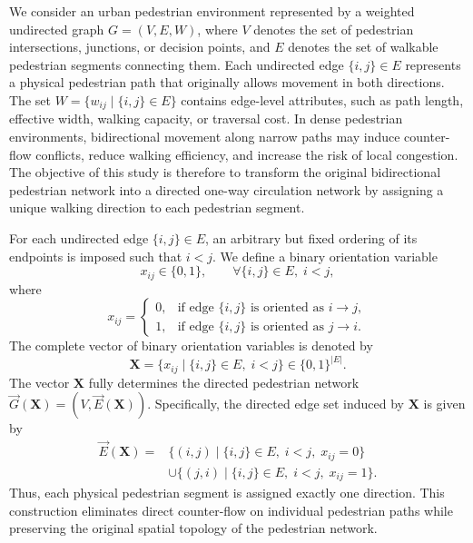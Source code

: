 \documentclass[twocolumn,a4paper]{article} %
\begin{document}
We consider an urban pedestrian environment represented by a weighted undirected graph $ G=(V,E,W)$, where \(V\) denotes the set of pedestrian intersections, junctions, or decision points, and \(E\) denotes the set of walkable pedestrian segments connecting them. Each undirected edge \(\{i,j\}\in E\) represents a physical pedestrian path that originally allows movement in both directions. The set \(W=\{w_{ij}\mid \{i,j\}\in E\}\) contains edge-level attributes, such as path length, effective width, walking capacity, or traversal cost. In dense pedestrian environments, bidirectional movement along narrow paths may induce counter-flow conflicts, reduce walking efficiency, and increase the risk of local congestion. The objective of this study is therefore to transform the original bidirectional pedestrian network into a directed one-way circulation network by assigning a unique walking direction to each pedestrian segment.

For each undirected edge \(\{i,j\}\in E\), an arbitrary but fixed ordering of its endpoints is imposed such that \(i<j\). We define a binary orientation variable
\begin{equation}
    x_{ij}\in\{0,1\}, \qquad \forall \{i,j\}\in E,\; i<j,
\end{equation}
where
\begin{equation}
x_{ij}=
\begin{cases}
0, & \text{if edge } \{i,j\} \text{ is oriented as } i\rightarrow j,\\
1, & \text{if edge } \{i,j\} \text{ is oriented as } j\rightarrow i.
\end{cases}
\end{equation}
The complete vector of binary orientation variables is denoted by
\begin{equation}
    \mathbf{X}
    =
    \{x_{ij}\mid \{i,j\}\in E,\; i<j\}
    \in \{0,1\}^{|E|}.
\end{equation}
The vector \(\mathbf{X}\) fully determines the directed pedestrian network $\vec{G}(\mathbf{X})=(V,\vec{E}(\mathbf{X}))$. Specifically, the directed edge set induced by \(\mathbf{X}\) is given by
\begin{equation}
\begin{aligned}
    \vec{E}(\mathbf{X})
    =
    &\{(i,j)\mid \{i,j\}\in E,\; i<j,\; x_{ij}=0\} \\
    &\cup
    \{(j,i)\mid \{i,j\}\in E,\; i<j,\; x_{ij}=1\}.
\end{aligned}
\end{equation}
Thus, each physical pedestrian segment is assigned exactly one direction. This construction eliminates direct counter-flow on individual pedestrian paths while preserving the original spatial topology of the pedestrian network.
\end{document}
